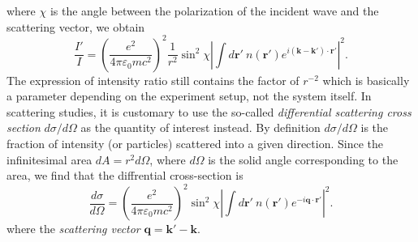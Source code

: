 where $\chi$ is the angle between the polarization of the incident wave and the scattering vector, we obtain
\begin{equation}
\frac{I'}{I} = \left(\frac{e^2}{4\pi\varepsilon_0 m c^2} \right)^2 \frac{1}{r^2} \sin^2 \chi \left|\int d\mathbf{r}' \  n(\mathbf{r}')  e^{i (\mathbf{k}-\mathbf{k}')\cdot\mathbf{r}'} \right|^2.
\end{equation}
The expression of intensity ratio still contains the factor of $r^{-2}$ which is basically a parameter depending on the experiment setup, not the system itself. In scattering studies, it is customary to use the so-called \emph{differential scattering cross section} $d \sigma / d\Omega$ as the 
quantity of interest instead. By definition $d \sigma / d\Omega$ is the fraction of intensity (or particles) scattered into a given direction. Since the infinitesimal area $dA = r^2 d \Omega$, where $d \Omega$ is the solid angle corresponding to the area, we find that the diffrential cross-section is
\begin{equation}
\frac{d \sigma}{d \Omega} = \left(\frac{e^2}{4\pi\varepsilon_0 m c^2} \right)^2 \sin^2 \chi \left|\int d\mathbf{r}' \  n(\mathbf{r}')  e^{-i \mathbf{q}\cdot\mathbf{r}'} \right|^2.
\end{equation}
where the \emph{scattering vector} $\mathbf{q} = \mathbf{k}' - \mathbf{k}$.